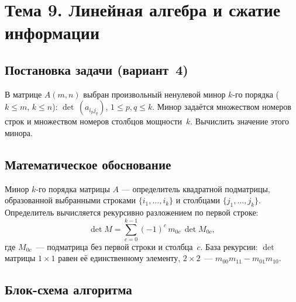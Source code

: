 \section{Тема 9. Линейная алгебра и сжатие информации}

\subsection{Постановка задачи (вариант~4)}

В матрице $A(m,n)$ выбран произвольный ненулевой минор $k$-го
порядка ($k \le m$, $k \le n$): $\det\,(a_{i_pj_q})$, $1\le p,q\le
k$. Минор задаётся множеством номеров строк и множеством номеров
столбцов мощности~$k$. Вычислить значение этого минора.

\subsection{Математическое обоснование}

Минор $k$-го порядка матрицы $A$ --- определитель квадратной
подматрицы, образованной выбранными строками $\{i_1,\ldots,i_k\}$
и столбцами $\{j_1,\ldots,j_k\}$. Определитель вычисляется
рекурсивно разложением по первой строке:
\[
  \det M = \sum_{c=0}^{k-1} (-1)^{c} \, m_{0c} \, \det M_{0c},
\]
где $M_{0c}$~--- подматрица без первой строки и столбца~$c$.
База рекурсии: $\det$ матрицы $1{\times}1$ равен её единственному
элементу, $2{\times}2$~--- $m_{00}m_{11}-m_{01}m_{10}$.

\subsection{Блок-схема алгоритма}

